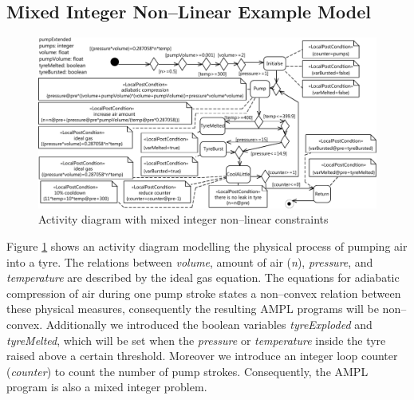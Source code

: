 \documentclass[runningheads,a4paper]{llncs}%
\newcommand{\OCLVar}[1]{\textit{#1}}
\begin{document}
\subsection{Mixed Integer Non--Linear Example Model}
\label{sec:exampleModelNonConvex}
\begin{figure}
\includegraphics[width=\textwidth]{pics/pumpTyre.pdf}
\caption{Activity diagram with mixed integer non--linear constraints}
\label{fig:pumpTyre}
\end{figure}
Figure \ref{fig:pumpTyre} shows an activity diagram modelling the physical
process of pumping air into a tyre. The relations between \OCLVar{volume},
amount of air (\OCLVar{n}), \OCLVar{pressure}, and \OCLVar{temperature} are
described by the ideal gas equation. The equations for adiabatic compression of
air during one pump stroke states a non--convex relation between these physical
measures, consequently the resulting AMPL programs will be non--convex.
Additionally we introduced the boolean variables \OCLVar{tyreExploded} and
\OCLVar{tyreMelted}, which will be set when the \OCLVar{pressure} or
\OCLVar{temperature} inside the tyre raised above a certain threshold. Moreover
we introduce an integer loop counter (\OCLVar{counter}) to count the number of
pump strokes. Consequently, the AMPL program is also a mixed integer problem.
%
\end{document}
